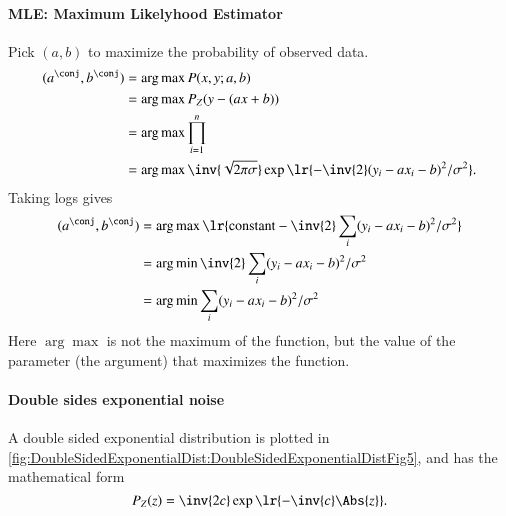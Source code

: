 \paragraph{MLE: Maximum Likelyhood Estimator}
Pick \( (a,b) \) to maximize the probability of observed data.
\begin{equation}\label{eqn:L1introduction:420}
\begin{aligned}
(a^\conj, b^\conj)
&= \arg \max P( x, y ; a, b ) \\
&= \arg \max P_Z( y - (a x + b) ) \\
&= \arg \max \prod_{i = 1}^n \\
&= \arg \max \inv{\sqrt{2 \pi \sigma}} \exp\lr{ -\inv{2} (y_i - a x_i - b)^2/\sigma^2 }.
\end{aligned}
\end{equation}
%
Taking logs gives
\begin{equation}\label{eqn:L1introduction:440}
\begin{aligned}
(a^\conj, b^\conj)
&= \arg \max
\lr{
\textrm{constant}
   -\inv{2} \sum_i (y_i - a x_i - b)^2/\sigma^2
} \\
&= \arg \min \inv{2} \sum_i (y_i - a x_i - b)^2/\sigma^2 \\
&= \arg \min \sum_i (y_i - a x_i - b)^2/\sigma^2
\end{aligned}
\end{equation}
%
Here \( \arg \max \) is not the maximum of the function, but the value of the parameter (the argument) that maximizes the function.
\paragraph{Double sides exponential noise}
A double sided exponential distribution is plotted in \cref{fig:DoubleSidedExponentialDist:DoubleSidedExponentialDistFig5}, and has the mathematical form
%
\begin{equation}\label{eqn:L1introduction:460}
P_Z(z) = \inv{2 c} \exp\lr{ -\inv{c} \Abs{z} }.
\end{equation}

